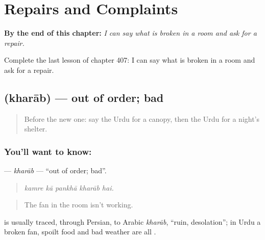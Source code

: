 
\chapter{Repairs and Complaints}
\label{ch:ur-repairs-and-complaints}

\begin{chapteropening}
\textbf{By the end of this chapter:} \emph{I can say what is broken in a room and ask for a repair.}

Complete the last lesson of chapter 407: I can say what is broken in a room and ask for a repair.
\end{chapteropening}

\section[\texorpdfstring{\ur{خراب} (kharāb)}{خراب (kharāb)}]{ (kharāb) — out of order; bad}

\label{lesson:UR-C407-kharab}



\begin{quote}
Before the new one: say the Urdu for a canopy, then the Urdu for a night's shelter.
\end{quote}

\subsection*{You'll want to know: }
\textbf{} — \emph{kharāb} — \textquotedblleft{}out of order; bad\textquotedblright{}.

\begin{quote}
    
\end{quote}

\begin{quote}
\emph{kamre kā pankhā kharāb hai.}
\end{quote}

\begin{quote}
The fan in the room isn't working.
\end{quote}

\begin{cousinweb}
is usually traced, through Persian, to Arabic \emph{kharāb}, \textquotedblleft{}ruin, desolation\textquotedblright{}; in Urdu a broken fan, spoilt food and bad weather are all \textbf{}.
\end{cousinweb}

